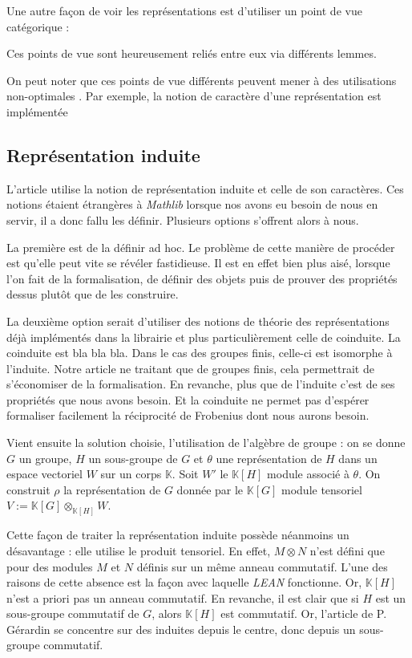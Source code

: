 \documentclass[10pt]{article}
\theoremstyle{definition}
\begin{document}
Une autre façon de voir les représentations est d'utiliser un point de vue catégorique :
\newline

Ces points de vue sont heureusement reliés entre eux via différents lemmes.

On peut noter que ces points de vue différents peuvent mener à des utilisations \og non-optimales \fg. Par exemple, la notion de caractère d'une représentation est implémentée 


\subsection{Représentation induite}
L'article utilise la notion de représentation induite et celle de son caractères. Ces notions étaient étrangères à \textit{Mathlib} lorsque nos avons eu besoin de nous en servir, il a donc fallu les définir. Plusieurs options s'offrent alors à nous.
\newline

La première est de la définir ad hoc. Le problème de cette manière de procéder est qu'elle peut vite se révéler fastidieuse. Il est en effet bien plus aisé, lorsque l'on fait de la formalisation, de définir des objets puis de prouver des propriétés dessus plutôt que de les construire.
\newline

La deuxième option serait d'utiliser des notions de théorie des représentations déjà implémentés dans la librairie et plus particulièrement celle de coinduite. La coinduite est bla bla bla. Dans le cas des groupes finis, celle-ci est isomorphe à l'induite. Notre article ne traitant que de groupes finis, cela permettrait de s'économiser de la formalisation. En revanche, plus que de l'induite c'est de ses propriétés que nous avons besoin. Et la coinduite ne permet pas d'espérer formaliser facilement la réciprocité de Frobenius dont nous aurons besoin.
\newline

Vient ensuite la solution choisie, l'utilisation de l'algèbre de groupe : on se donne $G$ un groupe, $H$ un sous-groupe de $G$ et $\theta$ une représentation de $H$ dans un espace vectoriel $W$ sur un corps $\mathbb{K}$. Soit $W'$ le $\mathbb{K}[H]$ module associé à $\theta$. On construit $\rho$ la représentation de $G$ donnée par le $\mathbb{K}[G]$ module tensoriel $V:=\mathbb{K}[G]\otimes_{\mathbb{K}[H]}W$.
\newline 

Cette façon de traiter la représentation induite possède néanmoins un désavantage : elle utilise le produit tensoriel. En effet, $M\otimes N$ n'est défini que pour des modules $M$ et $N$ définis sur un même anneau commutatif. L'une des raisons de cette absence est la façon avec laquelle \textit{LEAN} fonctionne. 
\newline
Or, $\mathbb{K}[H]$ n'est a priori pas un anneau commutatif. En revanche, il est clair que si $H$ est un sous-groupe commutatif de $G$, alors $\mathbb{K}[H]$ est commutatif. Or, l'article de P. Gérardin se concentre sur des induites depuis le centre, donc depuis un sous-groupe commutatif. 
\newline
\end{document}
